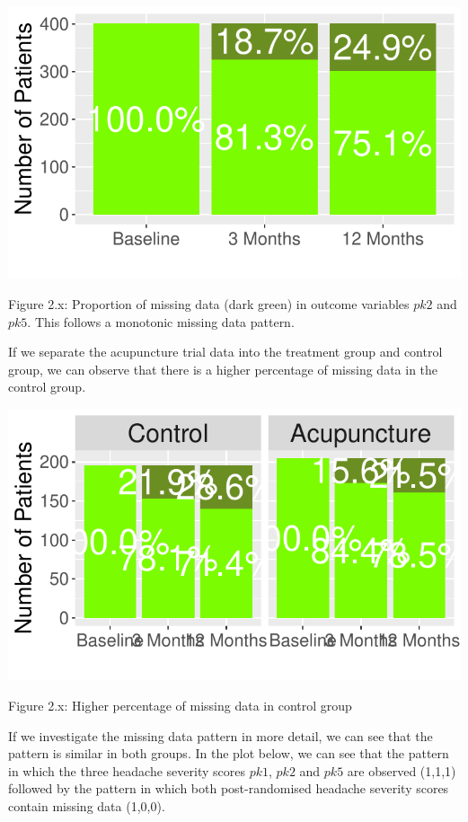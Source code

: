 \documentclass{article}
\newcommand{\pandocbounded}[1]{#1}
\begin{document}
\pandocbounded{\includegraphics[keepaspectratio]{Final_Report_files/figure-latex/unnamed-chunk-19-1.pdf}}

Figure 2.x: Proportion of missing data (dark green) in outcome variables
\(pk2\) and \(pk5\). This follows a monotonic missing data pattern.

If we separate the acupuncture trial data into the treatment group and
control group, we can observe that there is a higher percentage of
missing data in the control group.

\pandocbounded{\includegraphics[keepaspectratio]{Final_Report_files/figure-latex/unnamed-chunk-20-1.pdf}}

Figure 2.x: Higher percentage of missing data in control group

If we investigate the missing data pattern in more detail, we can see
that the pattern is similar in both groups. In the plot below, we can
see that the pattern in which the three headache severity scores
\(pk1\), \(pk2\) and \(pk5\) are observed (1,1,1) followed by the
pattern in which both post-randomised headache severity scores contain
missing data (1,0,0).
\end{document}
